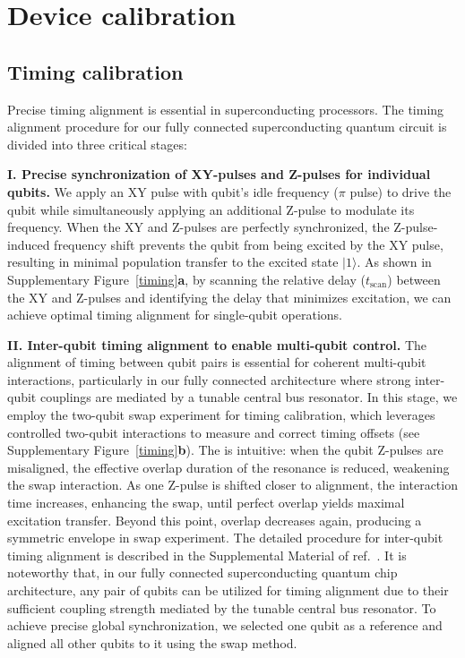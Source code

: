 \documentclass[reprint,superscriptaddress,preprintnumbers,longbibliography,
amsmath,amssymb,aps,floatfix,pra,twocolumn, tightenlines %
]{revtex4-2}
\begin{document}
    \clearpage
    \newpage


\section{Device calibration}
\subsection{ Timing calibration}

    Precise timing alignment is essential in superconducting processors. The timing alignment procedure for our fully connected superconducting quantum circuit is divided into three critical stages: 

    
    \textbf{I. Precise synchronization of XY-pulses and Z-pulses for individual qubits.} We apply an XY pulse with qubit’s idle frequency ($\pi$ pulse) to drive the qubit while simultaneously applying an additional Z-pulse to modulate its frequency. When the XY and Z-pulses are perfectly synchronized, the Z-pulse-induced frequency shift prevents the qubit from being excited by the XY pulse, resulting in minimal population transfer to the excited state $|1\rangle$. As shown in Supplementary Figure~\ref{timing}\textbf{a}, by scanning the relative delay ($t_{\text{scan}}$) between the XY and Z-pulses and identifying the delay that minimizes excitation, we can achieve optimal timing alignment for single-qubit operations.

    \textbf{II. Inter-qubit timing alignment to enable multi-qubit control.} The alignment of timing between qubit pairs is essential for coherent multi-qubit interactions, particularly in our fully connected architecture where strong inter-qubit couplings are mediated by a tunable central bus resonator. In this stage, we employ the two-qubit swap experiment for timing calibration, which leverages controlled two-qubit interactions to measure and correct timing offsets (see Supplementary Figure~\ref{timing}\textbf{b}). The is intuitive: when the qubit Z-pulses are misaligned, the effective overlap duration of the resonance is reduced, weakening the swap interaction. As one Z-pulse is shifted closer to alignment, the interaction time increases, enhancing the swap, until perfect overlap yields maximal excitation transfer. Beyond this point, overlap decreases again, producing a symmetric envelope in swap experiment. The detailed procedure for inter-qubit timing alignment is described in the Supplemental Material of ref.~\cite{PRXQuantum_wyy}. 
    It is noteworthy that, in our fully connected superconducting quantum chip architecture, any pair of qubits can be utilized for timing alignment due to their sufficient coupling strength mediated by the tunable central bus resonator. To achieve precise global synchronization, we selected one qubit as a reference and aligned all other qubits to it using the swap method. 
    
\end{document}
